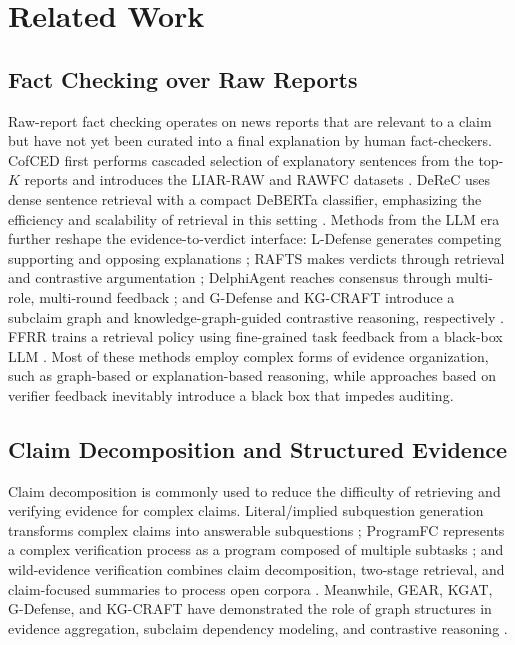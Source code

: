 \documentclass[letterpaper]{article}
\begin{document}
\section{Related Work}

\subsection{Fact Checking over Raw Reports}

Raw-report fact checking operates on news reports that are relevant to a claim but have not yet been curated into a final explanation by human fact-checkers. CofCED first performs cascaded selection of explanatory sentences from the top-$K$ reports and introduces the LIAR-RAW and RAWFC datasets \citep{Yang2022CofCED}. DeReC uses dense sentence retrieval with a compact DeBERTa classifier, emphasizing the efficiency and scalability of retrieval in this setting \citep{Qazi2025DeReC}. Methods from the LLM era further reshape the evidence-to-verdict interface: L-Defense generates competing supporting and opposing explanations \citep{Wang2024LDefense}; RAFTS makes verdicts through retrieval and contrastive argumentation \citep{Yue2024RAFTS}; DelphiAgent reaches consensus through multi-role, multi-round feedback \citep{Xiong2025DelphiAgent}; and G-Defense and KG-CRAFT introduce a subclaim graph and knowledge-graph-guided contrastive reasoning, respectively \citep{Wang2026GDefense,Lourenco2026KGCRAFT}. FFRR trains a retrieval policy using fine-grained task feedback from a black-box LLM \citep{Zhang2024FFRR}. Most of these methods employ complex forms of evidence organization, such as graph-based or explanation-based reasoning, while approaches based on verifier feedback inevitably introduce a black box that impedes auditing. 

\subsection{Claim Decomposition and Structured Evidence}

Claim decomposition is commonly used to reduce the difficulty of retrieving and verifying evidence for complex claims. Literal/implied subquestion generation transforms complex claims into answerable subquestions \citep{Chen2022ClaimDecomp}; ProgramFC represents a complex verification process as a program composed of multiple subtasks \citep{Pan2023ProgramFC}; and wild-evidence verification combines claim decomposition, two-stage retrieval, and claim-focused summaries to process open corpora \citep{Chen2023WildEvidence}. Meanwhile, GEAR, KGAT, G-Defense, and KG-CRAFT have demonstrated the role of graph structures in evidence aggregation, subclaim dependency modeling, and contrastive reasoning \citep{Zhou2019GEAR,Liu2019KGAT,Wang2026GDefense,Lourenco2026KGCRAFT}. 
\end{document}
